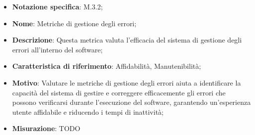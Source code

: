 \begin{itemize}
    \item \textbf{Notazione specifica}: M.3.2;
    \item \textbf{Nome}: Metriche di gestione degli errori;
    \item \textbf{Descrizione}: Questa metrica valuta l'efficacia del sistema di gestione degli errori all'interno del software;
    \item \textbf{Caratteristica di riferimento}: Affidabilità, Manutenibilità;
    \item \textbf{Motivo}: Valutare le metriche di gestione degli errori aiuta a identificare la capacità del sistema di gestire e correggere efficacemente gli errori che possono verificarsi durante l'esecuzione del software, garantendo un'esperienza utente affidabile e riducendo i tempi di inattività;
    \item \textbf{Misurazione}: TODO
\end{itemize}

